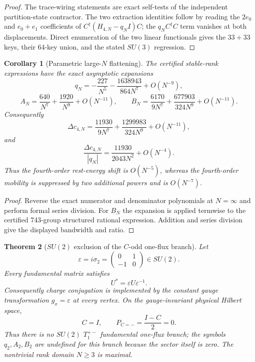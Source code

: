 \documentclass[11pt]{article}
\newtheorem{theorem}{Theorem}[section]
\newtheorem{corollary}[theorem]{Corollary}
\begin{document}
\begin{proof}
The trace-wiring statements are exact self-tests of the independent
partition-state contractor. The two extraction identities follow by reading
the $2e_0$ and $e_0+e_1$ coefficients of
$C^\dagger(H_{4,N}-q_NI)C$; the $q_NC^\dagger C$ term vanishes at both
displacements. Direct enumeration of the two linear functionals gives the
$33+33$ keys, their 64-key union, and the stated $SU(3)$ regression.
\end{proof}

\begin{corollary}[Parametric large-$N$ flattening]
\label{cor:sunlargeN}
The certified stable-rank expressions have the exact asymptotic expansions
\[
q_N=-\frac{227}{N^5}-\frac{1638943}{864N^7}+O(N^{-9}),
\]
\[
A_N=\frac{640}{N^7}+\frac{1920}{N^9}+O(N^{-11}),\qquad
B_N=\frac{6170}{9N^7}+\frac{677903}{324N^9}+O(N^{-11}).
\]
Consequently
\[
\Delta c_{4,N}=\frac{11930}{9N^7}
+\frac{1299983}{324N^9}+O(N^{-11}),
\]
and
\[
\frac{\Delta c_{4,N}}{|q_N|}
=\frac{11930}{2043N^2}+O(N^{-4}).
\]
Thus the fourth-order rest-energy shift is $O(N^{-5})$, whereas the
fourth-order mobility is suppressed by two additional powers and is
$O(N^{-7})$.
\end{corollary}

\begin{proof}
Reverse the exact numerator and denominator polynomials at $N=\infty$ and
perform formal series division. For $B_N$ the expansion is applied termwise
to the certified 743-group structured rational expression. Addition and
series division give the displayed bandwidth and ratio.
\end{proof}

\begin{theorem}[$SU(2)$ exclusion of the $C$-odd one-flux branch]
\label{thm:su2exclude}
Let
\[
\varepsilon=i\sigma_2=
\begin{pmatrix}0&1\\-1&0\end{pmatrix}\in SU(2).
\]
Every fundamental matrix satisfies
\[
U^*=\varepsilon U\varepsilon^{-1}.
\]
Consequently charge conjugation is implemented by the constant gauge
transformation $g_x=\varepsilon$ at every vertex. On the gauge-invariant
physical Hilbert space,
\[
C=I,\qquad P_{C=-}=\frac{I-C}{2}=0.
\]
Thus there is no $SU(2)$ $T_1^{+-}$ fundamental one-flux branch; the symbols
$q_2,A_2,B_2$ are undefined for this branch because the sector itself is zero.
The nontrivial rank domain $N\geq3$ is maximal.
\end{theorem}
\end{document}
